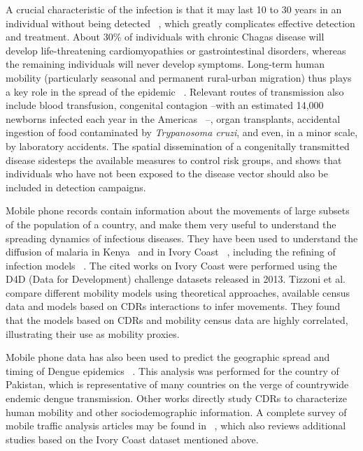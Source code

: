 A crucial characteristic of the infection is that it may last 10 to 30 years in an individual without being detected~ \textcite{rassi2012american}, which greatly complicates effective detection and treatment. About 30\% of individuals with chronic Chagas disease will develop life-threatening cardiomyopathies or gastrointestinal disorders, whereas
the remaining individuals will never develop symptoms.
Long-term human mobility (particularly seasonal and permanent rural-urban migration) thus plays a key role in the spread of the epidemic~ \textcite{briceno2009chagas}. Relevant routes of transmission also include blood transfusion, congenital contagion --with an estimated 14,000 newborns infected each year in the Americas~ \textcite{OPS2006chagas}--,
organ transplants,
accidental ingestion of food contaminated by \textit{Trypanosoma cruzi}, and even, in a minor scale,
by laboratory accidents.
The spatial dissemination of a congenitally transmitted disease sidesteps the available measures to control risk groups, and shows that individuals who have not been exposed to the disease vector should also be included in detection campaigns.

Mobile phone records contain information about the movements of large subsets of the population of a country, and make them very useful to understand the spreading dynamics of infectious diseases. They have been used to understand the diffusion of malaria in Kenya~ \textcite{wesolowski2012quantifying} and in Ivory Coast~ \textcite{enns2013human}, including the refining of infection models~ \textcite{chunara2013large}. The cited works on Ivory Coast were performed using the D4D (Data for Development) challenge datasets released in 2013. Tizzoni et al.~ \textcite{tizzoni2014use} compare different mobility models using theoretical approaches, available census data and models based on CDRs interactions to infer movements. They found that the models based on CDRs and mobility census data are highly correlated, illustrating their use as mobility proxies.

Mobile phone data has also been used to predict the geographic spread and timing of Dengue epidemics~ \textcite{wesolowski2015impact}. This analysis was performed for the country of Pakistan, which is representative of many countries on the verge of countrywide endemic dengue transmission. Other works directly study CDRs to characterize human mobility and other sociodemographic information. A complete survey of mobile traffic analysis articles may be found in~ \textcite{naboulsi2015mobile}, which also reviews additional studies based on the Ivory Coast dataset mentioned above.

